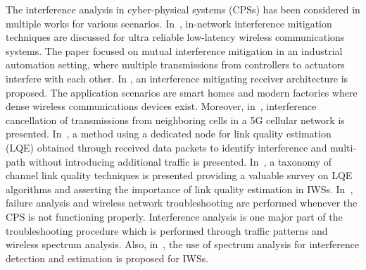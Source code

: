  The interference analysis in cyber-physical systems (CPSs) has been considered in multiple works for various scenarios. In~\cite{8639006}, in-network interference mitigation techniques are discussed for ultra reliable low-latency wireless communications systems. The paper focused on mutual interference mitigation in an industrial automation setting, where multiple transmissions from controllers to actuators interfere with each other. In \cite{Kumar2019}, an interference mitigating receiver architecture is proposed. The application scenarios are smart homes and modern factories where dense wireless communications devices exist. Moreover, in~\cite{Bhushan2014.NetworkDesensUsingIntfCancellation}, interference cancellation of transmissions from neighboring cells in a 5G cellular network is presented. In~\cite{Gomes2017.LQEinWSNs}, a method using a dedicated node for link quality estimation (LQE)  obtained through received data packets to identify interference and multi-path without introducing additional traffic is presented. In~\cite{Baccour2012.SurveyOnLinkEstimation}, a taxonomy of channel link quality techniques is presented providing a valuable survey on LQE algorithms and asserting the importance of link quality estimation in IWSs. In~\cite{Frounhoffer.Troubleshooting}, failure analysis and wireless network troubleshooting are performed whenever the CPS is not functioning properly. Interference analysis is one major part of the troubleshooting procedure which is performed through traffic patterns and wireless spectrum analysis. Also, in~\cite{NIST.InterfCoexCritical}, the use of spectrum analysis for interference detection and estimation is proposed for IWSs. 
 

